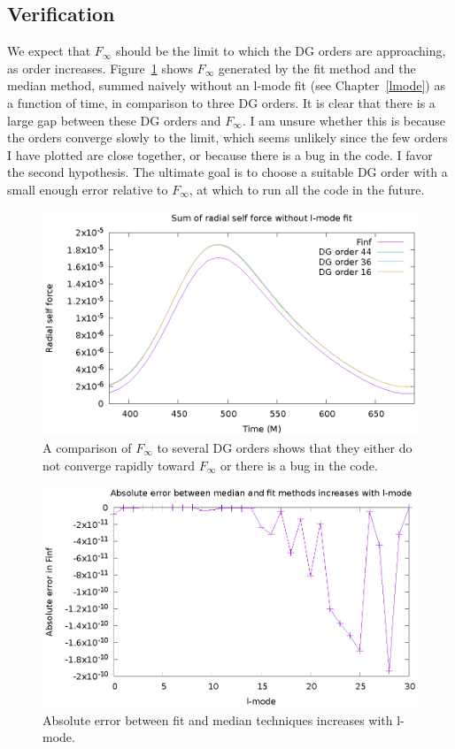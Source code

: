 \subsection{Verification}

We expect that $F_\infty$ should be the limit to which the DG orders are approaching, as order increases. Figure~\ref{limit} shows $F_\infty$ generated by the fit method and the median method, summed naively without an l-mode fit (see Chapter~\ref{lmode}) as a function of time, in comparison to three DG orders. It is clear that there is a large gap between these DG orders and $F_\infty$. I am unsure whether this is because the orders converge slowly to the limit, which seems unlikely since the few orders I have plotted are close together, or because there is a bug in the code. I favor the second hypothesis. The ultimate goal is to choose a suitable DG order with a small enough error relative to $F_\infty$, at which to run all the code in the future.

\begin{figure}
\includegraphics{unextrapsumcompareDG}
\caption{A comparison of $F_\infty$ to several DG orders shows that they either do not converge rapidly toward $F_\infty$ or there is a bug in the code.}
\label{limit}
\end{figure}


\begin{figure}
  \includegraphics{absErrorIncreaseslmode}
  \caption{Absolute error between fit and median techniques increases with l-mode.}
\end{figure}


